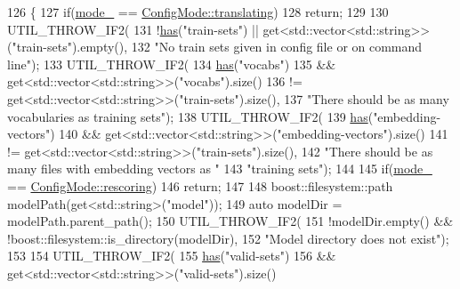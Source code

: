 \begin{DoxyCode}
126                                          \{
127   \textcolor{keywordflow}{if}(\hyperlink{classmarian_1_1ConfigParser_ae3bb2ffc2601222cc53734a60ab1f980}{mode\_} == \hyperlink{namespacemarian_aaddd4b008ff5352b1fe7e16574f7e1f9a5143d2bebfe7a6b9c7050a8f6bf53e2b}{ConfigMode::translating})
128     \textcolor{keywordflow}{return};
129 
130   UTIL\_THROW\_IF2(
131       !\hyperlink{classmarian_1_1ConfigParser_a667e86d91936eb1d19044891b060e987}{has}(\textcolor{stringliteral}{"train-sets"}) || \textcolor{keyword}{get}<std::vector<std::string>>(\textcolor{stringliteral}{"train-sets"}).empty(),
132       \textcolor{stringliteral}{"No train sets given in config file or on command line"});
133   UTIL\_THROW\_IF2(
134       \hyperlink{classmarian_1_1ConfigParser_a667e86d91936eb1d19044891b060e987}{has}(\textcolor{stringliteral}{"vocabs"})
135           && \textcolor{keyword}{get}<std::vector<std::string>>(\textcolor{stringliteral}{"vocabs"}).size()
136                  != \textcolor{keyword}{get}<std::vector<std::string>>(\textcolor{stringliteral}{"train-sets"}).size(),
137       \textcolor{stringliteral}{"There should be as many vocabularies as training sets"});
138   UTIL\_THROW\_IF2(
139       \hyperlink{classmarian_1_1ConfigParser_a667e86d91936eb1d19044891b060e987}{has}(\textcolor{stringliteral}{"embedding-vectors"})
140           && \textcolor{keyword}{get}<std::vector<std::string>>(\textcolor{stringliteral}{"embedding-vectors"}).size()
141                  != \textcolor{keyword}{get}<std::vector<std::string>>(\textcolor{stringliteral}{"train-sets"}).size(),
142       \textcolor{stringliteral}{"There should be as many files with embedding vectors as "}
143       \textcolor{stringliteral}{"training sets"});
144 
145   \textcolor{keywordflow}{if}(\hyperlink{classmarian_1_1ConfigParser_ae3bb2ffc2601222cc53734a60ab1f980}{mode\_} == \hyperlink{namespacemarian_aaddd4b008ff5352b1fe7e16574f7e1f9a6911beb2d5fc11863fef8f5daee5a184}{ConfigMode::rescoring})
146     \textcolor{keywordflow}{return};
147 
148   boost::filesystem::path modelPath(get<std::string>(\textcolor{stringliteral}{"model"}));
149   \textcolor{keyword}{auto} modelDir = modelPath.parent\_path();
150   UTIL\_THROW\_IF2(
151       !modelDir.empty() && !boost::filesystem::is\_directory(modelDir),
152       \textcolor{stringliteral}{"Model directory does not exist"});
153 
154   UTIL\_THROW\_IF2(
155       \hyperlink{classmarian_1_1ConfigParser_a667e86d91936eb1d19044891b060e987}{has}(\textcolor{stringliteral}{"valid-sets"})
156           && \textcolor{keyword}{get}<std::vector<std::string>>(\textcolor{stringliteral}{"valid-sets"}).size()

\end{DoxyCode}
